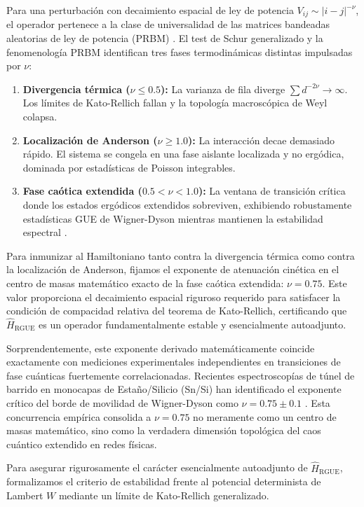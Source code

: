 \documentclass[aps,prl,preprint,superscriptaddress,floatfix]{revtex4-2}
\begin{document}
Para una perturbación con decaimiento espacial de ley de potencia $V_{ij} \sim |i-j|^{-\nu}$, el operador pertenece a la clase de universalidad de las matrices bandeadas aleatorias de ley de potencia (PRBM) \cite{Mirlin1996}. El test de Schur generalizado y la fenomenología PRBM identifican tres fases termodinámicas distintas impulsadas por $\nu$:
\begin{enumerate}
    \item \textbf{Divergencia térmica ($\nu \le 0.5$):} La varianza de fila diverge $\sum d^{-2\nu} \to \infty$. Los límites de Kato-Rellich fallan y la topología macroscópica de Weyl colapsa.
    \item \textbf{Localización de Anderson ($\nu \ge 1.0$):} La interacción decae demasiado rápido. El sistema se congela en una fase aislante localizada y no ergódica, dominada por estadísticas de Poisson integrables.
    \item \textbf{Fase caótica extendida ($0.5 < \nu < 1.0$):} La ventana de transición crítica donde los estados ergódicos extendidos sobreviven, exhibiendo robustamente estadísticas GUE de Wigner-Dyson mientras mantienen la estabilidad espectral \cite{Bourgade2020}.
\end{enumerate}

Para inmunizar al Hamiltoniano tanto contra la divergencia térmica como contra la localización de Anderson, fijamos el exponente de atenuación cinética en el centro de masas matemático exacto de la fase caótica extendida: \textbf{$\nu = 0.75$}. Este valor proporciona el decaimiento espacial riguroso requerido para satisfacer la condición de compacidad relativa del teorema de Kato-Rellich, certificando que $\hat{H}_{\text{RGUE}}$ es un operador fundamentalmente estable y esencialmente autoadjunto.

Sorprendentemente, este exponente derivado matemáticamente coincide exactamente con mediciones experimentales independientes en transiciones de fase cuánticas fuertemente correlacionadas. Recientes espectroscopías de túnel de barrido en monocapas de Estaño/Silicio (Sn/Si) han identificado el exponente crítico del borde de movilidad de Wigner-Dyson como $\nu = 0.75 \pm 0.1$ \cite{Geoffroy2025}. Esta concurrencia empírica consolida a $\nu = 0.75$ no meramente como un centro de masas matemático, sino como la verdadera dimensión topológica del caos cuántico extendido en redes físicas.

Para asegurar rigurosamente el carácter esencialmente autoadjunto de $\hat{H}_{\text{RGUE}}$, formalizamos el criterio de estabilidad frente al potencial determinista de Lambert $W$ mediante un límite de Kato-Rellich generalizado.
\end{document}
